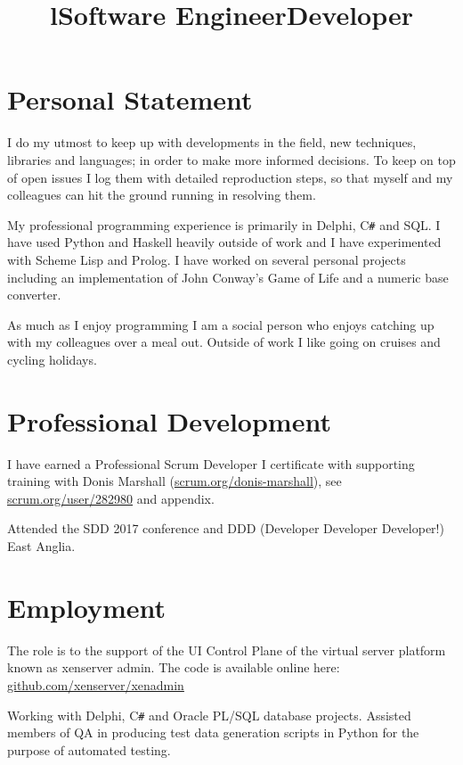 \documentclass[line,margin]{res}
\title{l} \location{r} \\
\newcommand{\CSharp}{C\texttt{\#}}
\begin{document}
\begin{resume}

\section{Personal Statement}
I do my utmost to keep up with developments in the field,
new techniques, libraries and languages;
in order to make more informed decisions.
To keep on top of open issues I log them with detailed reproduction steps,
so that myself and my colleagues can hit the ground running in resolving them.

My professional programming experience is primarily in
Delphi, {\CSharp} and SQL.
I have used Python and Haskell heavily outside of work and
I have experimented with Scheme Lisp and Prolog.
I have worked on several personal projects including an implementation of
John Conway's Game of Life and a numeric base converter.

As much as I enjoy programming I am a social person who enjoys catching up with
my colleagues over a meal out.
Outside of work I like going on cruises and cycling holidays.

\section{Professional Development}
I have earned a Professional Scrum Developer I certificate with supporting
training with Donis Marshall
(\href{https://www.scrum.org/donis-marshall}{scrum.org/donis-marshall}), see
\href{https://www.scrum.org/user/282980}{scrum.org/user/282980} and appendix.

Attended the SDD 2017 conference and
DDD (Developer Developer Developer!) East Anglia.

\section{Employment}

\title{Software Engineer}
\begin{position}
The role is to the support of the UI Control Plane
of the virtual server platform known as xenserver admin.
The code is available online here:
\href{https://github.com/xenserver/xenadmin}{github.com/xenserver/xenadmin}
\end{position}

\title{Developer}
\begin{position}
Working with Delphi, {\CSharp} and Oracle PL/SQL database projects.
Assisted members of QA in producing test data generation scripts in Python
for the purpose of automated testing.


\end{position}
\end{resume}
\end{document}
